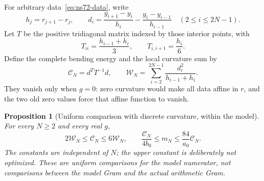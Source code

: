 \documentclass[11pt]{article}
\newtheorem{proposition}[theorem]{Proposition}
\theoremstyle{remark}
\begin{document}
For arbitrary data~\eqref{eq:ns72-data}, write
\[
 h_j=r_{j+1}-r_j,\qquad
 d_i=\frac{y_{i+1}-y_i}{h_i}-\frac{y_i-y_{i-1}}{h_{i-1}}
       \quad(2\leq i\leq2N-1).
\]
Let $T$ be the positive tridiagonal matrix indexed by those interior
points, with
\[
 T_{ii}=\frac{h_{i-1}+h_i}{3},\qquad T_{i,i+1}=\frac{h_i}{6}.
\]
Define the complete bending energy and the local curvature sum by
\[
 \mathcal C_N=d^TT^{-1}d,\qquad
 \mathcal W_N=\sum_{i=2}^{2N-1}\frac{d_i^2}{h_{i-1}+h_i}.
\]
They vanish only when $g=0$: zero curvature would make all data affine
in $r$, and the two old zero values force that affine function to vanish.

\begin{proposition}[Uniform comparison with discrete curvature, within the model]
\label{prop:ns72-curvature}
For every $N\geq2$ and every real $g$,
\begin{equation}
 2\mathcal W_N\leq\mathcal C_N\leq6\mathcal W_N,
 \qquad
 \frac{\mathcal C_N}{4b_0}\leq m_N
                         \leq\frac{84}{a_0}\mathcal C_N.
 \label{eq:ns72-curvature-comparison}
\end{equation}
The constants are independent of $N$; the upper constant is deliberately
not optimized. These are uniform comparisons for the model numerator,
not comparisons between the model Gram and the actual arithmetic Gram.
\end{proposition}
\end{document}
